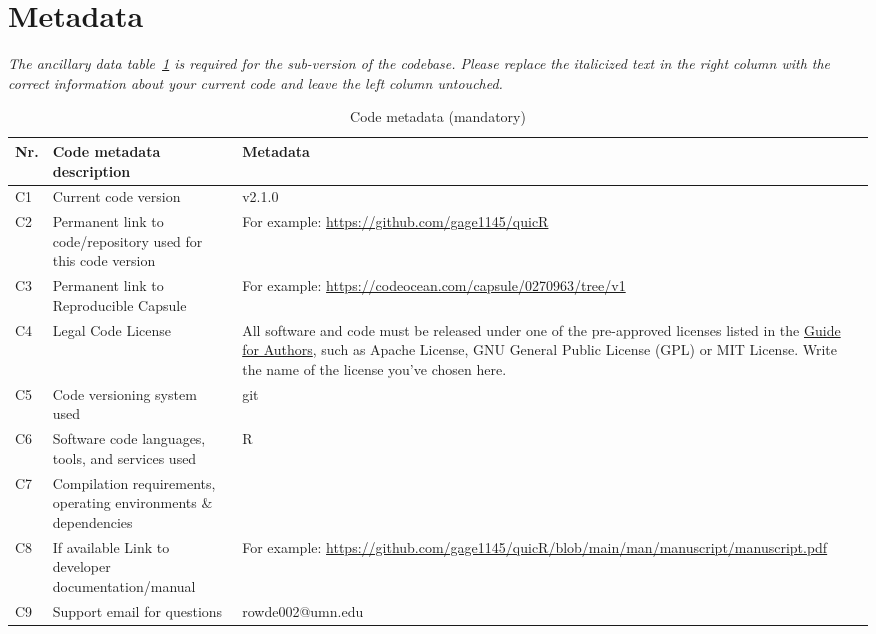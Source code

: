 \documentclass[preprint,12pt, a4paper]{elsarticle}
\begin{document}

\section*{Metadata}
\label{}
\textit{The ancillary data table~\ref{codeMetadata} is required for the sub-version of the codebase. Please replace the italicized text in the right column with the correct information about your current code and leave the left column untouched.}

\begin{table}[ht]
\begin{tabular}{|l|p{6.5cm}|p{6.5cm}|}
\hline
\textbf{Nr.} & \textbf{Code metadata description} & \textbf{Metadata} \\
\hline
C1 & Current code version & v2.1.0 \\
\hline
C2 & Permanent link to code/repository used for this code version & For example: \url{https://github.com/gage1145/quicR} \\
\hline
C3  & Permanent link to Reproducible Capsule & For example: \url{https://codeocean.com/capsule/0270963/tree/v1}\\
\hline
C4 & Legal Code License   & All software and code must be released under one of the pre-approved licenses listed in the \href{https://www.elsevier.com/journals/softwarex/2352-7110/guide-for-authors}{Guide for Authors}, such as Apache License, GNU General Public License (GPL) or MIT License. Write the name of the license you’ve chosen here. \\
\hline
C5 & Code versioning system used & git \\
\hline
C6 & Software code languages, tools, and services used & R \\
\hline
C7 & Compilation requirements, operating environments \& dependencies & \\
\hline
C8 & If available Link to developer documentation/manual & For example: \url{https://github.com/gage1145/quicR/blob/main/man/manuscript/manuscript.pdf} \\
\hline
C9 & Support email for questions & rowde002@umn.edu\\
\hline
\end{tabular}
\caption{Code metadata (mandatory)}
\label{codeMetadata} 
\end{table}

\end{document}
